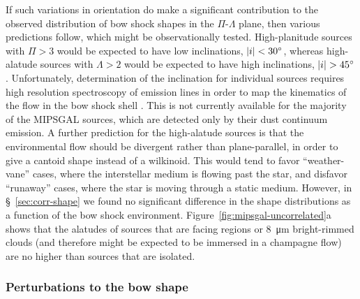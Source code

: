 If such variations in orientation do make a significant contribution
to the observed distribution of bow shock shapes in the
\(\Pi\)-\(\Lambda\) plane, then various predictions follow, which might be
observationally tested.  High-planitude sources with \(\Pi > 3\) would
be expected to have low inclinations, \(\lvert i\rvert < \ang{30}\), whereas
high-alatude sources with \(\Lambda > 2\) would be expected to have high
inclinations, \(\lvert i\rvert > \ang{45}\).  Unfortunately, determination of
the inclination for individual sources requires high resolution
spectroscopy of emission lines in order to map the kinematics of the
flow in the bow shock shell \citep[e.g.,][]{Henney:2013a}.  This is
not currently available for the majority of the MIPSGAL sources, which
are detected only by their dust continuum emission.  A further
prediction for the high-alatude sources is that the environmental flow
should be divergent rather than plane-parallel, in order to give a
cantoid shape instead of a wilkinoid.  This would tend to favor
``weather-vane'' cases, where the interstellar medium is flowing past
the star, and disfavor ``runaway'' cases, where the star is moving
through a static medium.  However, in \S~\ref{sec:corr-shape} we found
no significant difference in the shape distributions as a function of
the bow shock environment.  Figure~\ref{fig:mipsgal-uncorrelated}a
shows that the alatudes of sources that are facing \hii{} regions or
\SI{8}{\um} bright-rimmed clouds (and therefore might be expected to
be immersed in a champagne flow) are no higher than sources that are
isolated.

\subsubsection{Perturbations to the bow shape}
\label{sec:pert-bow-shape}


